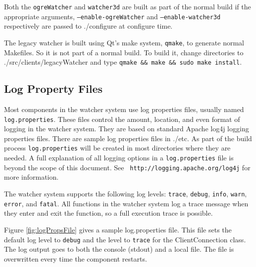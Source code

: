 \documentclass{article}
\begin{document}
Both the {\tt ogreWatcher} and {\tt watcher3d} are built as part of the normal build if the appropriate arguments, {\tt --enable-ogreWatcher} and {\tt --enable-watcher3d} respectively are passed to 
.\slash configure at configure time. 

The legacy watcher is built using Qt's make system, {\tt qmake}, to generate normal Makefiles. So it is not part of a normal build. To build it, change
directories to .\slash src\slash clients\slash legacyWatcher and type {\tt qmake \&\& make \&\& sudo make install}. 

\subsection{Log Property Files}
Most components in the watcher system use log properties files, usually named {\tt log.properties}. These files control the amount, location, and even format of logging in the 
watcher system. They are based on standard Apache log4j logging properties files. There are sample log properties files in .\slash etc. As part of the build process {\tt log.properties} 
will be created in most directories where they are needed. A full explanation of all logging options in a {\tt log.properties} file is beyond the scope of this document. See {\tt
http://logging.apache.org/log4j} for more information. 

The watcher system supports the following log levels: {\tt trace}, {\tt debug}, {\tt info}, {\tt warn}, {\tt error}, and {\tt fatal}. All functions in the watcher system
log a trace message when they enter and exit the function, so a full execution trace is possible. 

Figure \ref{fig:logPropsFile} gives a sample log.properties file. This file sets the default log level to {\tt debug} and the level to {\tt trace} for the ClientConnection class. The 
log output goes to both the console (stdout) and a local file. The file is overwritten every time the component restarts. 
\end{document}

